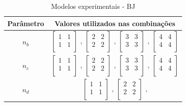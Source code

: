 \begin{table}[h]
	\centering
	\caption{Modelos experimentais - BJ}
	\label{tab:tclabsp-models-bj}
	\begin{tabular}{c|c} \toprule
		{Parâmetro}		&	{Valores utilizados nas combinações}									\\ \midrule
		$n_b$			&
							$ \begin{bmatrix}	1	&	1	\\	1	&	1	\\	\end{bmatrix} $	,		
							$ \begin{bmatrix}	2	&	2	\\	2	&	2	\\	\end{bmatrix} $	,		
							$ \begin{bmatrix}	3	&	3	\\	3	&	3	\\	\end{bmatrix} $	,		
							$ \begin{bmatrix}	4	&	4	\\	4	&	4	\\	\end{bmatrix} $		\\ \midrule
		$n_c$			&
							$ \begin{bmatrix}	1	&	1	\\	1	&	1	\\	\end{bmatrix} $	,		
							$ \begin{bmatrix}	2	&	2	\\	2	&	2	\\	\end{bmatrix} $	,		
							$ \begin{bmatrix}	3	&	3	\\	3	&	3	\\	\end{bmatrix} $	,		
							$ \begin{bmatrix}	4	&	4	\\	4	&	4	\\	\end{bmatrix} $		\\ \midrule
		$n_d$			&
							$ \begin{bmatrix}	1	&	1	\\	1	&	1	\\	\end{bmatrix} $	,		
							$ \begin{bmatrix}	2	&	2	\\	2	&	2	\\	\end{bmatrix} $	,		

\end{tabular}
\end{table}
